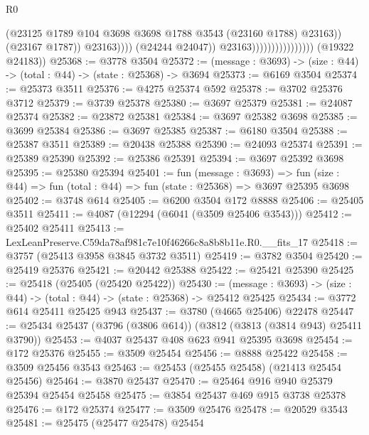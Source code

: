 \begin{lexlean}{R0}
\begin{coremodule}
                                                    (@23125
                                                      @1789
                                                      @104
                                                      @3698
                                                      @3698
                                                      @1788
                                                      @3543
                                                      (@23160 @1788)
                                                      @23163))
                                                  (@23167 @1787))
                                                @23163))))
                                        (@24244 @24047))
                                      @23163))))))))))))))))
      (@19322 @24183))
@25368 := @3778 @3504
@25372 := (message : @3693) -> (size : @44) -> (total : @44) -> (state : @25368) -> @3694
@25373 := @6169 @3504
@25374 := @25373 @3511
@25376 := @4275 @25374 @592
@25378 := @3702 @25376 @3712
@25379 := @3739 @25378
@25380 := @3697 @25379
@25381 := @24087 @25374
@25382 := @23872 @25381
@25384 := @3697 @25382 @3698
@25385 := @3699 @25384
@25386 := @3697 @25385
@25387 := @6180 @3504
@25388 := @25387 @3511
@25389 := @20438 @25388
@25390 := @24093 @25374
@25391 := @25389 @25390
@25392 := @25386 @25391
@25394 := @3697 @25392 @3698
@25395 := @25380 @25394
@25401 := fun (message : @3693) =>
  fun (size : @44) => fun (total : @44) => fun (state : @25368) => @3697 @25395 @3698
@25402 := @3748 @614
@25405 := @6200 @3504 @172 @8888
@25406 := @25405 @3511
@25411 := @4087 (@12294 (@6041 (@3509 @25406 @3543)))
@25412 := @25402 @25411
@25413 := LexLeanPreserve.C59da78af981c7e10f46266c8a8b8b11e.R0.__fits_17
@25418 := @3757 (@25413 @3958 @3845 @3732 @3511)
@25419 := @3782 @3504
@25420 := @25419 @25376
@25421 := @20442 @25388
@25422 := @25421 @25390
@25425 := @25418 (@25405 (@25420 @25422))
@25430 := (message : @3693) -> (size : @44) -> (total : @44) -> (state : @25368) -> @25412 @25425
@25434 := @3772 @614 @25411 @25425 @943
@25437 := @3780 (@4665 @25406) @22478
@25447 := @25434 @25437 (@3796 (@3806 @614)) (@3812 (@3813 (@3814 @943) @25411 @3790))
@25453 := @4037 @25437 @408 @623 @941 @25395 @3698
@25454 := @172 @25376
@25455 := @3509 @25454
@25456 := @8888 @25422
@25458 := @3509 @25456 @3543
@25463 := @25453 (@25455 @25458) (@21413 @25454 @25456)
@25464 := @3870 @25437
@25470 := @25464 @916 @940 @25379 @25394 @25454 @25458
@25475 := @3854 @25437 @469 @915 @3738 @25378
@25476 := @172 @25374
@25477 := @3509 @25476
@25478 := @20529 @3543
@25481 := @25475 (@25477 @25478) @25454

\end{coremodule}
\end{lexlean}
